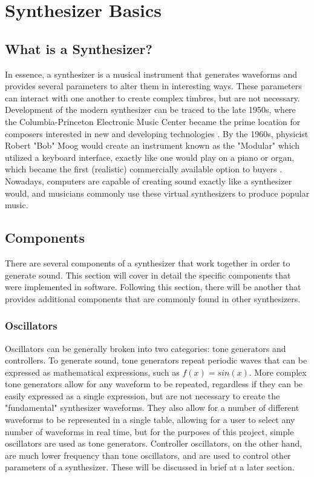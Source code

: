 \documentclass[12pt]{article}
\begin{document}
\section{Synthesizer Basics}

\subsection{What is a Synthesizer?}
In essence, a synthesizer is a musical instrument that generates waveforms and provides several parameters to alter them in interesting ways. These parameters can interact with one another to create complex timbres, but are not necessary. Development of the modern synthesizer can be traced to the late 1950s, where the Columbia-Princeton Electronic Music Center became the prime location for composers interested in new and developing technologies \cite{Pejrolo_2017}. By the 1960s, physicist Robert "Bob" Moog would create an instrument known as the "Modular" which utilized a keyboard interface, exactly like one would play on a piano or organ, which became the first (realistic) commercially available option to buyers \cite{Pejrolo_2017}. Nowadays, computers are capable of creating sound exactly like a synthesizer would, and musicians commonly use these virtual synthesizers to produce popular music. 

\subsection{Components}
There are several components of a synthesizer that work together in order to generate sound. This section will cover in detail the specific components that were implemented in software. Following this section, there will be another that provides additional components that are commonly found in other synthesizers.

\subsubsection{Oscillators}
Oscillators can be generally broken into two categories: tone generators and controllers. To generate sound, tone generators repeat periodic waves that can be expressed as mathematical expressions, such as \(f(x) = sin(x)\). More complex tone generators allow for any waveform to be repeated, regardless if they can be easily expressed as a single expression, but are not necessary to create the "fundamental" synthesizer waveforms. They also allow for a number of different waveforms to be represented in a single table, allowing for a user to select any number of waveforms in real time, but for the purposes of this project, simple oscillators are used as tone generators. Controller oscillators, on the other hand, are much lower frequency than tone oscillators, and are used to control other parameters of a synthesizer. These will be discussed in brief at a later section.
\end{document}
